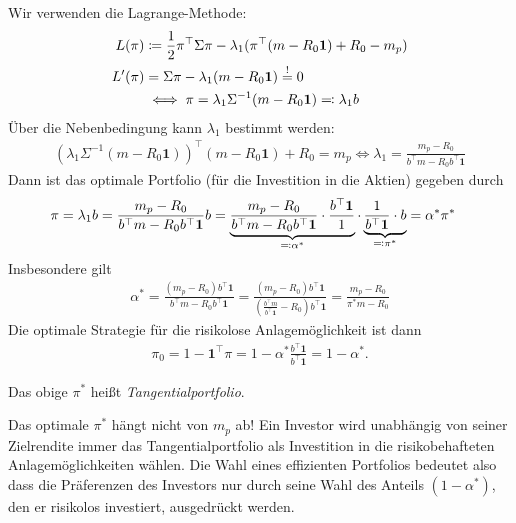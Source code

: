 \documentclass[a4paper,twoside,DIV15,BCOR12mm]{scrbook}
\begin{document}
Wir verwenden die Lagrange-Methode:
\begin{align*}
L(\pi) &\da \frac12 \pi^\top \Sigma \pi - \lambda_1(\pi^\top(m-R_0\mathbf 1)+ R_0 - m_p) \\
L'(\pi) &= \Sigma\pi - \lambda_1(m-R_0\mathbf 1) \stackrel!= 0\\
&\iff \pi = \lambda_1\Sigma^{-1}(m-R_0\mathbf 1) \ad \lambda_1 b
\end{align*}
Über die Nebenbedingung kann $\lambda_1$ bestimmt werden:
\begin{align*}
(\lambda_1\Sigma^{-1}(m- R_0\mathbf 1))^\top(m-R_0\mathbf 1) + R_0 = m_p \iff \lambda_1=\frac{m_p-R_0}{b^\top m - R_0b^\top \mathbf 1}
\end{align*}
Dann ist das optimale Portfolio (für die Investition in die Aktien) gegeben durch
\begin{align*}
\pi&=\lambda_1b =\frac{m_p - R_0}{b^\top m - R_0b^\top\mathbf 1} b = \underbrace{\frac{m_p-R_0}{b^\top m - R_0b^\top \mathbf 1}\cdot\frac{b^\top\mathbf 1}1}_{\ad \alpha^*}\cdot\underbrace{\frac1{b^\top\mathbf 1}\cdot b}_{\ad \pi^*} = \alpha^* \pi^*
\end{align*}
Insbesondere gilt
\begin{align*}
\alpha^* = \frac{(m_p-R_0)b^\top \mathbf 1}{b^\top m - R_0 b^\top \mathbf 1} = 
\frac{(m_p-R_0)b^\top \mathbf 1}{(\frac{b^\top m}{b^\top\mathbf 1} - R_0) b^\top \mathbf 1}
= \frac{m_p-R_0}{\pi^* m - R_0}
\end{align*}
Die optimale Strategie für die risikolose Anlagemöglichkeit ist dann
\begin{align*}
\pi_0 = 1 - \mathbf 1^\top\pi = 1 - \alpha^* \frac{b^\top\mathbf 1}{b^\top\mathbf 1} = 1- \alpha^*.
\end{align*}

\begin{definition}
Das obige $\pi^*$ heißt \emph{Tangentialportfolio}.
\end{definition}

\begin{bemerkung}
Das optimale $\pi^*$ hängt nicht von $m_p$ ab! Ein Investor wird unabhängig von seiner Zielrendite immer das Tangentialportfolio als Investition in die risikobehafteten Anlagemöglichkeiten wählen. Die Wahl eines effizienten Portfolios bedeutet also dass die Präferenzen des Investors nur durch seine Wahl des Anteils $(1-\alpha^*)$, den er risikolos investiert, ausgedrückt werden.
\end{bemerkung}
\end{document}
